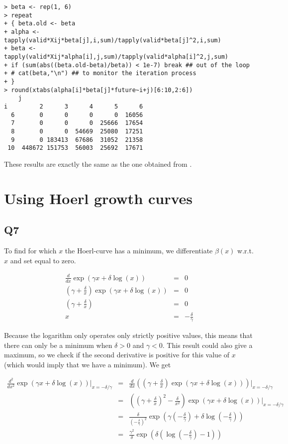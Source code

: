 \documentclass[11pt]{article}
\begin{document}
\begin{verbatim}
> beta <- rep(1, 6)
> repeat
+ { beta.old <- beta
+ alpha <- tapply(valid*Xij*beta[j],i,sum)/tapply(valid*beta[j]^2,i,sum)
+ beta <- tapply(valid*Xij*alpha[i],j,sum)/tapply(valid*alpha[i]^2,j,sum)
+ if (sum(abs((beta.old-beta)/beta)) < 1e-7) break ## out of the loop
+ # cat(beta,"\n") ## to monitor the iteration process
+ }
> round(xtabs(alpha[i]*beta[j]*future~i+j)[6:10,2:6])
    j
i         2      3      4      5      6
  6       0      0      0      0  16056
  7       0      0      0  25666  17654
  8       0      0  54669  25080  17251
  9       0 183413  67686  31052  21358
 10  448672 151753  56003  25692  17671
\end{verbatim}

These results are exactly the same as the one obtained from .

\section{Using Hoerl growth curves}

\subsection*{Q7}

To find for which $x$ the Hoerl-curve has a minimum, we differentiate $\beta(x)$ w.r.t. $x$ and set equal to zero.

\begin{eqnarray}
\frac{d}{dx} \exp(\gamma x + \delta \log(x)) &=& 0 \\
(\gamma + \frac{\delta}{x})\exp(\gamma x + \delta \log(x)) &=& 0 \\ 
(\gamma + \frac{\delta}{x}) &=& 0 \\
x &=& -\frac{\delta}{\gamma}
\end{eqnarray}

Because the logarithm only operates only strictly positive values, this means that there can only be a minimum when $\delta > 0$ and $\gamma < 0$. This result could also give a maximum, so we check if the second derivative is positive for this value of $x$ (which would imply that we have a minimum). We get

\begin{eqnarray}
\frac{d^2}{dx^2} \exp(\gamma x + \delta \log(x))|_{x =-\delta / \gamma} &=& \frac{d}{dx}\left(  (\gamma + \frac{\delta}{x})\exp(\gamma x + \delta \log(x))\right)|_{x =-\delta / \gamma}  \\
&=& ((\gamma + \frac{\delta}{x})^{2} - \frac{\delta}{x^{2}}) \exp(\gamma x + \delta \log(x))|_{x =-\delta / \gamma} \\
&=& \frac{\delta}{(-\frac{\delta}{\gamma})^{2}} \exp(\gamma (-\frac{\delta}{\gamma}) + \delta \log(-\frac{\delta}{\gamma})) \\
&=& \frac{\gamma^{2}}{\delta} \exp(\delta( \log(-\frac{\delta}{\gamma})-1))
\end{eqnarray}
\end{document}
